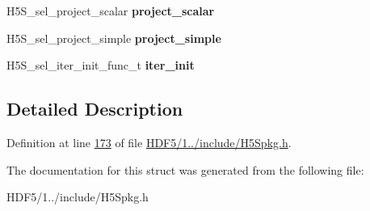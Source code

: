 \begin{DoxyCompactItemize}
H5\+S\+\_\+sel\+\_\+project\+\_\+scalar {\bfseries project\+\_\+scalar}
\item 
\mbox{\label{struct_h5_s__select__class__t_a84bc120bc2501fc7eeb0ef83edb6c6a4}} 
H5\+S\+\_\+sel\+\_\+project\+\_\+simple {\bfseries project\+\_\+simple}
\item 
\mbox{\label{struct_h5_s__select__class__t_a5664a9ac8fd4a3d08abcc96e3e4d2460}} 
H5\+S\+\_\+sel\+\_\+iter\+\_\+init\+\_\+func\+\_\+t {\bfseries iter\+\_\+init}
\end{DoxyCompactItemize}


\subsection{Detailed Description}


Definition at line \hyperlink{_h_d_f5_21_810_81_2include_2_h5_spkg_8h_source_l00173}{173} of file \hyperlink{_h_d_f5_21_810_81_2include_2_h5_spkg_8h_source}{H\+D\+F5/1../include/\+H5\+Spkg.\+h}.



The documentation for this struct was generated from the following file\+:\begin{DoxyCompactItemize}
\item 
H\+D\+F5/1../include/\+H5\+Spkg.\+h\end{DoxyCompactItemize}
